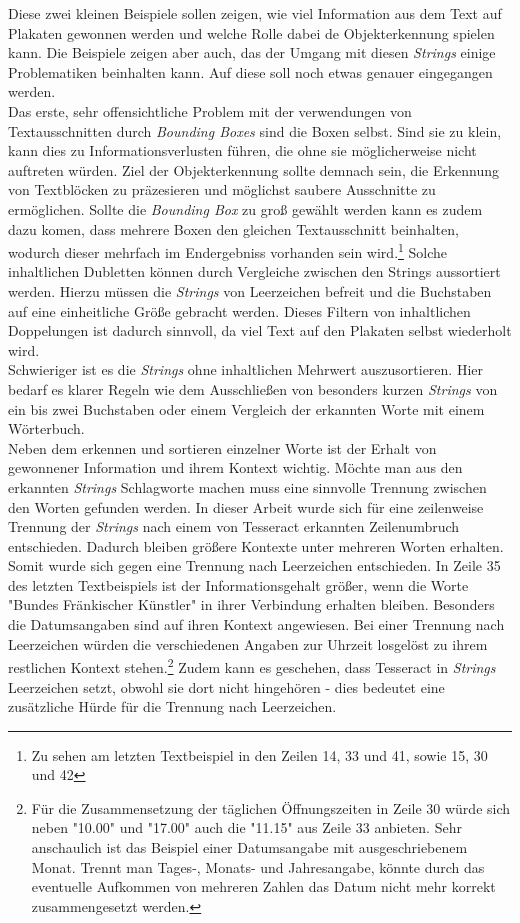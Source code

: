 \documentclass[a4paper,12pt,ngerman]{article}
\begin{document}
Diese zwei kleinen Beispiele sollen zeigen, wie viel Information aus dem Text auf Plakaten gewonnen werden und welche Rolle dabei de Objekterkennung spielen kann. Die Beispiele zeigen aber auch, das der Umgang mit diesen \textit{Strings} einige Problematiken beinhalten kann. Auf diese soll noch etwas genauer eingegangen werden.\\
Das erste, sehr offensichtliche Problem mit der verwendungen von Textausschnitten durch \textit{Bounding Boxes} sind die Boxen selbst. Sind sie zu klein, kann dies zu Informationsverlusten führen, die ohne sie möglicherweise nicht auftreten würden. Ziel der Objekterkennung sollte demnach sein, die Erkennung von Textblöcken zu präzesieren und möglichst saubere Ausschnitte zu ermöglichen. Sollte die \textit{Bounding Box} zu groß gewählt werden kann es zudem dazu komen, dass mehrere Boxen den gleichen Textausschnitt beinhalten, wodurch dieser mehrfach im Endergebniss vorhanden sein wird.\footnote{Zu sehen am letzten Textbeispiel in den Zeilen 14, 33 und 41, sowie 15, 30 und 42} Solche inhaltlichen Dubletten können durch Vergleiche zwischen den Strings aussortiert werden. Hierzu müssen die \textit{Strings} von Leerzeichen befreit und die Buchstaben auf eine einheitliche Größe gebracht werden. Dieses Filtern von inhaltlichen Doppelungen ist dadurch sinnvoll, da viel Text auf den Plakaten selbst wiederholt wird.\\
Schwieriger ist es die \textit{Strings} ohne inhaltlichen Mehrwert auszusortieren. Hier bedarf es klarer Regeln wie dem Ausschließen von besonders kurzen \textit{Strings} von ein bis zwei Buchstaben oder einem Vergleich der erkannten Worte mit einem Wörterbuch.\\
Neben dem erkennen und sortieren einzelner Worte ist der Erhalt von gewonnener Information und ihrem Kontext wichtig. Möchte man aus den erkannten \textit{Strings} Schlagworte machen muss eine sinnvolle Trennung zwischen den Worten gefunden werden. In dieser Arbeit wurde sich für eine zeilenweise Trennung der \textit{Strings} nach einem von Tesseract erkannten Zeilenumbruch entschieden. Dadurch bleiben größere Kontexte unter mehreren Worten erhalten. Somit wurde sich gegen eine Trennung nach Leerzeichen entschieden. In Zeile 35 des letzten Textbeispiels ist der Informationsgehalt größer, wenn die Worte "Bundes Fränkischer Künstler" in ihrer Verbindung erhalten bleiben. Besonders die Datumsangaben sind auf ihren Kontext angewiesen. Bei einer Trennung nach Leerzeichen würden die verschiedenen Angaben zur Uhrzeit losgelöst zu ihrem restlichen Kontext stehen.\footnote{Für die Zusammensetzung der täglichen Öffnungszeiten in Zeile 30 würde sich neben "10.00" und "17.00" auch die "11.15" aus Zeile 33 anbieten. Sehr anschaulich ist das Beispiel einer Datumsangabe mit ausgeschriebenem Monat. Trennt man Tages-, Monats- und Jahresangabe, könnte durch das eventuelle Aufkommen von mehreren Zahlen das Datum nicht mehr korrekt zusammengesetzt werden.} Zudem kann es geschehen, dass Tesseract in \textit{Strings} Leerzeichen setzt, obwohl sie dort nicht hingehören - dies bedeutet eine zusätzliche Hürde für die Trennung nach Leerzeichen.\\
\end{document}
